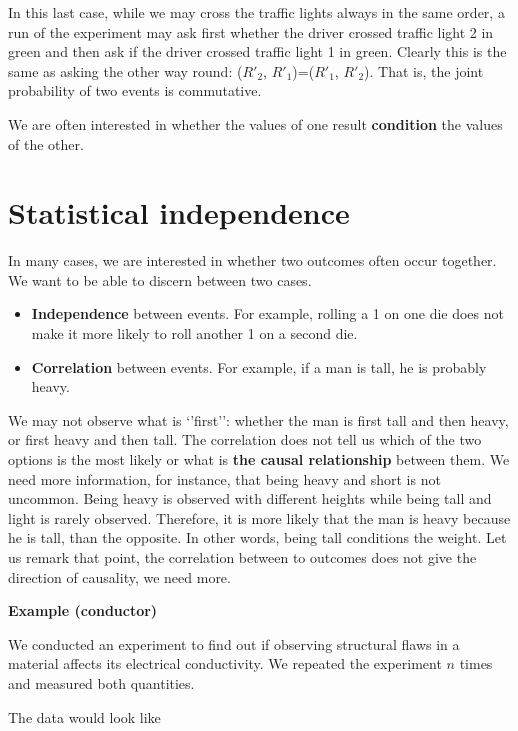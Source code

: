 \documentclass[
]{book}
\begin{document}
In this last case, while we may cross the traffic lights always in the same order, a run of the experiment may ask first whether the driver crossed traffic light 2 in green and then ask if the driver crossed traffic light 1 in green. Clearly this is the same as asking the other way round: (\(R'_ 2\), \(R'_1\))=(\(R'_1\), \(R'_2\)). That is, the joint probability of two events is commutative.

We are often interested in whether the values of one result \textbf{condition} the values of the other.

\hypertarget{statistical-independence}{%
\section{Statistical independence}\label{statistical-independence}}

In many cases, we are interested in whether two outcomes often occur together. We want to be able to discern between two cases.

\begin{itemize}
\item
  \textbf{Independence} between events. For example, rolling a 1 on one die does not make it more likely to roll another 1 on a second die.
\item
  \textbf{Correlation} between events. For example, if a man is tall, he is probably heavy.
\end{itemize}

We may not observe what is `'first'': whether the man is first tall and then heavy, or first heavy and then tall. The correlation does not tell us which of the two options is the most likely or what is \textbf{the causal relationship} between them. We need more information, for instance, that being heavy and short is not uncommon. Being heavy is observed with different heights while being tall and light is rarely observed. Therefore, it is more likely that the man is heavy because he is tall, than the opposite. In other words, being tall conditions the weight. Let us remark that point, the correlation between to outcomes does not give the direction of causality, we need more.

\textbf{Example (conductor)}

We conducted an experiment to find out if observing structural flaws in a material affects its electrical conductivity. We repeated the experiment \(n\) times and measured both quantities.

The data would look like
\end{document}
